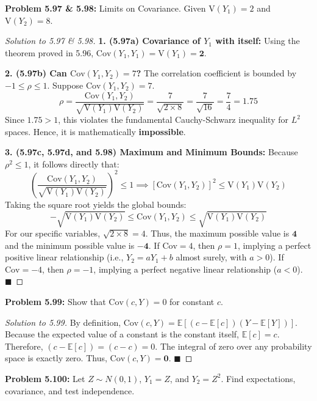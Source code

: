 \documentclass[11pt, a4paper]{article}
\theoremstyle{definition}
\theoremstyle{remark}
\newcommand{\E}{\mathbb{E}}
\newcommand{\Cov}{\mathrm{Cov}}
\newcommand{\Var}{\mathrm{V}}
\begin{document}
\vspace{1em}
\noindent\textbf{Problem 5.97 \& 5.98:} Limits on Covariance. Given $\Var(Y_1) = 2$ and $\Var(Y_2) = 8$.

\begin{proof}[Solution to 5.97 \& 5.98]
\textbf{1. (5.97a) Covariance of $Y_1$ with itself:}
Using the theorem proved in 5.96, $\Cov(Y_1, Y_1) = \Var(Y_1) = \mathbf{2}$.

\textbf{2. (5.97b) Can $\Cov(Y_1, Y_2) = 7$?}
The correlation coefficient is bounded by $-1 \le \rho \le 1$. Suppose $\Cov(Y_1, Y_2) = 7$.
\[
\rho = \frac{\Cov(Y_1, Y_2)}{\sqrt{\Var(Y_1)\Var(Y_2)}} = \frac{7}{\sqrt{2 \times 8}} = \frac{7}{\sqrt{16}} = \frac{7}{4} = 1.75
\]
Since $1.75 > 1$, this violates the fundamental Cauchy-Schwarz inequality for $L^2$ spaces. Hence, it is mathematically \textbf{impossible}.

\textbf{3. (5.97c, 5.97d, and 5.98) Maximum and Minimum Bounds:}
Because $\rho^2 \le 1$, it follows directly that:
\[
\left( \frac{\Cov(Y_1, Y_2)}{\sqrt{\Var(Y_1)\Var(Y_2)}} \right)^2 \le 1 \implies [\Cov(Y_1, Y_2)]^2 \le \Var(Y_1)\Var(Y_2)
\]
Taking the square root yields the global bounds:
\[
-\sqrt{\Var(Y_1)\Var(Y_2)} \le \Cov(Y_1, Y_2) \le \sqrt{\Var(Y_1)\Var(Y_2)}
\]
For our specific variables, $\sqrt{2 \times 8} = 4$.
Thus, the maximum possible value is $\mathbf{4}$ and the minimum possible value is $\mathbf{-4}$.
If $\Cov = 4$, then $\rho = 1$, implying a perfect positive linear relationship (i.e., $Y_2 = aY_1 + b$ almost surely, with $a > 0$). If $\Cov = -4$, then $\rho = -1$, implying a perfect negative linear relationship ($a < 0$). $\blacksquare$
\end{proof}

\vspace{1em}
\noindent\textbf{Problem 5.99:} Show that $\Cov(c, Y) = 0$ for constant $c$.

\begin{proof}[Solution to 5.99]
By definition, $\Cov(c, Y) = \E[(c - \E[c])(Y - \E[Y])]$.
Because the expected value of a constant is the constant itself, $\E[c] = c$.
Therefore, $(c - \E[c]) = (c - c) = 0$.
The integral of zero over any probability space is exactly zero. Thus, $\Cov(c, Y) = \mathbf{0}$. $\blacksquare$
\end{proof}

\vspace{1em}
\noindent\textbf{Problem 5.100:} Let $Z \sim N(0,1)$, $Y_1 = Z$, and $Y_2 = Z^2$. Find expectations, covariance, and test independence.
\end{document}
